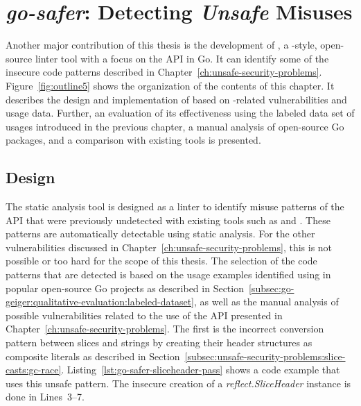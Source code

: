 
\chapter{\textit{go-safer}: Detecting \textit{Unsafe} Misuses}\label{ch:go-safer}

Another major contribution of this thesis is the development of \toolSafer{}, a \toolVet{}-style, open-source linter
tool with a focus on the \unsafe{} \acrshort{API} in Go.
It can identify some of the insecure code patterns described in Chapter~\ref{ch:unsafe-security-problems}.
Figure~\ref{fig:outline5} shows the organization of the contents of this chapter.
It describes the design and implementation of \toolSafer{} based on \unsafe{}-related vulnerabilities and usage data.
Further, an evaluation of its effectiveness using the labeled data set of \unsafe{} usages introduced in the
previous chapter, a manual analysis of open-source Go packages, and a comparison with existing tools is presented.





\section{Design}\label{sec:go-safer:design}

The \toolSafer{} static analysis tool is designed as a linter to identify  misuse patterns of the
\unsafe{} \acrshort{API} that were previously undetected with existing tools such as \toolVet{} and \toolGosec{}.
These patterns are automatically detectable using static analysis.
For the other vulnerabilities discussed in Chapter~\ref{ch:unsafe-security-problems}, this is not possible or too hard
for the scope of this thesis.
The selection of the code patterns that are detected is based on the \unsafe{} usage examples identified using
\toolGeiger{} in popular open-source Go projects as described in
Section~\ref{subsec:go-geiger:qualitative-evaluation:labeled-dataset}, as well as the manual analysis of possible
vulnerabilities related to the use of the \unsafe{} \acrshort{API} presented in
Chapter~\ref{ch:unsafe-security-problems}.
The first is the incorrect conversion pattern between slices and strings by creating their header structures as
composite literals as described in Section~\ref{subsec:unsafe-security-problems:slice-casts:gc-race}.
Listing~\ref{lst:go-safer-sliceheader-pass} shows a code example that uses this unsafe pattern.
The insecure creation of a \textit{reflect.SliceHeader} instance is done in Lines~3--7.

